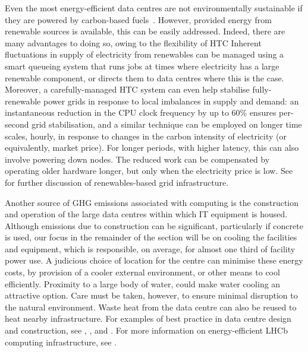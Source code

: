 \documentclass[../SustainableHEP.tex]{subfiles}
\begin{document}
Even the most energy-efficient data centres are not environmentally sustainable if they are powered by carbon-based fuels~\cite{Bloom:2022gux}.  
However, provided energy from renewable sources is available, this can be easily addressed. Indeed, there are many advantages to doing so, owing to the flexibility of HTC
Inherent fluctuations in supply of electricity from renewables can be managed using a smart queueing system that runs jobs at times where electricity has a large renewable component,
 or directs them to data centres where this is the case.  
Moreover, a carefully-managed HTC system can even help stabilise fully-renewable power grids in response to local imbalances in supply and demand: 
an instantaneous reduction in the CPU clock frequency by up to 60\% ensures per-second grid stabilisation,
and a similar technique can be employed on longer time scales, \eg hourly, in response to changes in the carbon intensity of electricity (or equivalently, market price). 
For longer periods, with higher latency, this can also involve powering down nodes. 
The reduced work can be compensated by operating older hardware longer, but only when the electricity price is low.  
See  for further discussion of renewables-based grid infrastructure.  

Another source of GHG emissions associated with computing is the construction and operation of the large data centres within which IT equipment is housed.  Although emissions due to construction can be significant, particularly if concrete is used, our focus in the remainder of the section will be on cooling the facilities and equipment, which is responsible, on average, for almost one third of facility power use. A judicious choice of location for the centre can minimise these energy costs, by provision of a cooler external environment, or other means to cool efficiently.  Proximity to a large body of water, \eg could make water cooling an attractive option.  Care must be taken, however, to ensure minimal disruption to the natural environment.  Waste heat from the data centre can also be reused to heat nearby infrastructure. For examples of best practice in data centre design and construction, see , , and .  For more information on energy-efficient LHCb computing infrastructure, see . 

\end{document}
